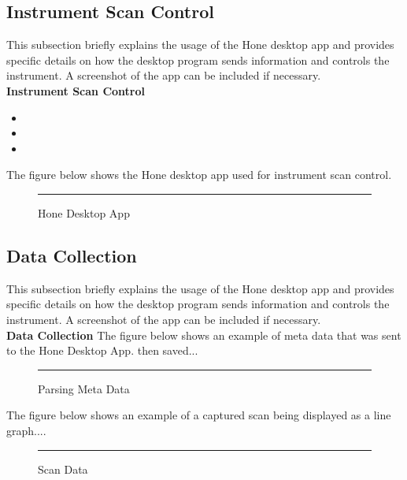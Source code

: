\documentclass{UoNMCHA}
\numberwithin{equation}{section}
\begin{document}
\subsection{Instrument Scan Control}\label{sub:Instrument Scan Control}
This subsection briefly explains the usage of the Hone desktop app and provides specific details on how the desktop program sends information and controls the instrument. A screenshot of the app can be included if necessary.	\\

\textbf{Instrument Scan Control}

\begin{itemize}
	\item 
	\item 
	\item 
\end{itemize}
The figure below shows the Hone desktop app used for instrument scan control.\\
\begin{figure}[h]
	\centering
	\rule{0.5\textwidth}{0.5\textwidth}%
	\caption{Hone Desktop App}
	\label{fig:Hone Desktop App}
\end{figure}


\subsection{Data Collection}\label{sub:Data Collection}
This subsection briefly explains the usage of the Hone desktop app and provides specific details on how the desktop program sends information and controls the instrument. A screenshot of the app can be included if necessary.	\\

\textbf{Data Collection}
The figure below shows an example of meta data that was sent to the Hone Desktop App. then saved... \\
\begin{figure}[h]
	\centering
	\rule{0.5\textwidth}{0.5\textwidth}%
	\caption{Parsing Meta Data}
	\label{fig:Parsing Meta Data}
\end{figure}
The figure below shows an example of a captured scan being displayed as a line graph....
\begin{figure}[h]
	\centering
	\rule{0.5\textwidth}{0.5\textwidth}%
	\caption{Scan Data}
	\label{fig:Scan Data}
\end{figure}
\newpage
\end{document}

